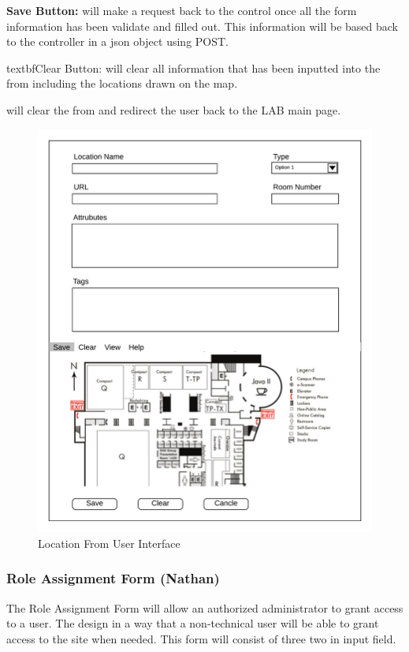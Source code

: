 \documentclass[letterpaper,10pt,titlepage, onecolumn, compsoc]{IEEEtran}
\begin{document}
\textbf{Save Button:} will make a request back to the control once all the form information has been validate and filled out. This information will be based back to the controller in a json object using POST.

textbf{Clear Button:} will clear all information that has been inputted into the from including the locations drawn on the map.

 will clear the from and redirect the user back to the LAB main page.

\begin{figure}[h!]
\centering
\includegraphics[scale=.45]{images/location-form.png}
\caption{Location From User Interface}
\label{fig:method}
\end{figure}

\subsubsection{Role Assignment Form (Nathan)}
The Role Assignment Form will allow an authorized administrator to grant access to a user. The design in a way that a non-technical user will be able to grant access to the site when needed. This form will consist of three two in input field. 
\end{document}
